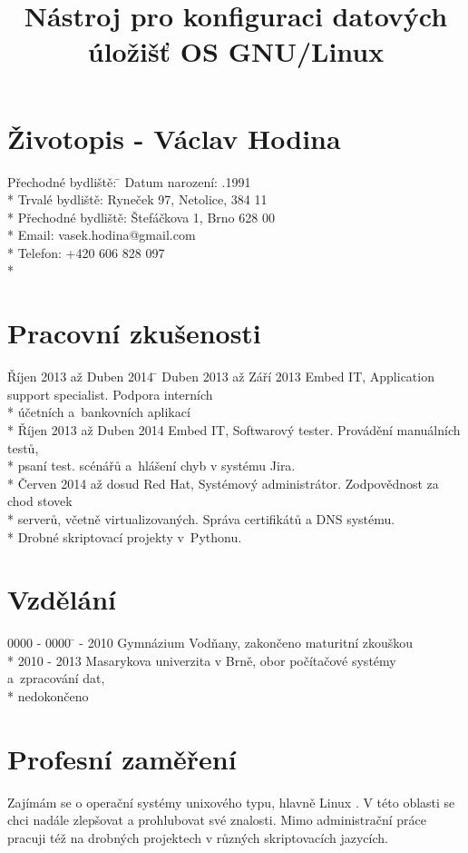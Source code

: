 \documentclass[a4paper]{article}
\title{Nástroj pro konfiguraci datových úložišť OS GNU/Linux}
\date{}
\begin{document}
\section*{Životopis - Václav Hodina}
\begin{tabbing}
Přechodné bydliště: \= \kill
Datum narození: .1991\\*
Trvalé bydliště: \> Ryneček 97, Netolice, 384 11\\*
Přechodné bydliště: \> Štefáčkova 1, Brno 628 00\\*
Email: \> vasek.hodina@gmail.com\\*
Telefon: \> +420 606 828 097\\*
\end{tabbing}

\section*{Pracovní zkušenosti}
\begin{tabbing}
Říjen 2013 až Duben 2014 \= \kill
Duben 2013 až Září 2013 \> Embed IT, Application support specialist. Podpora interních \\* \> účetních a~bankovních  aplikací\\* 
Říjen 2013 až Duben 2014 \> Embed IT, Softwarový tester. Provádění manuálních testů,\\* \> psaní test. scénářů  a~hlášení chyb v systému Jira.\\* 
Červen 2014 až dosud \> Red Hat, Systémový administrátor. Zodpovědnost za chod stovek \\* \>serverů, včetně  virtualizovaných. Správa certifikátů a DNS systému. \\* \>Drobné
skriptovací projekty  v~Pythonu.
\end{tabbing}

\section*{Vzdělání}
\begin{tabbing}
0000 - 0000 \=  - 2010 \>Gymnázium Vodňany, zakončeno maturitní zkouškou \\*
2010 - 2013 \>Masarykova univerzita v Brně, obor počítačové systémy a~zpracování dat,\\*
			\>nedokončeno
\end{tabbing}

\section*{Profesní zaměření}
Zajímám se o operační systémy unixového typu, hlavně Linux . V této oblasti se chci nadále zlepšovat a prohlubovat své znalosti. Mimo administrační práce pracuji též na
drobných projektech v různých skriptovacích jazycích.
\end{document}

